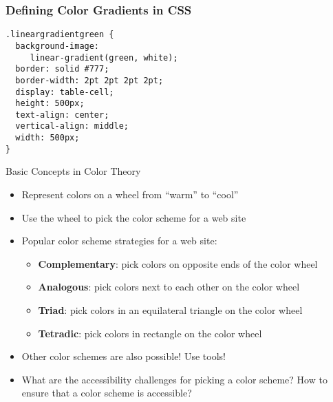 \documentclass[14pt,aspectratio=169]{beamer}
\begin{document}
%
\begin{frame}[fragile]
  \frametitle{Defining Color Gradients in CSS}
  \normalsize
  \begin{minipage}{6in}
    \vspace*{.1in}
    \begin{verbatim}
.lineargradientgreen {
  background-image:
     linear-gradient(green, white);
  border: solid #777;
  border-width: 2pt 2pt 2pt 2pt;
  display: table-cell;
  height: 500px;
  text-align: center;
  vertical-align: middle;
  width: 500px;
}
    \end{verbatim}
  \end{minipage}
\end{frame}


%
\begin{frame}{Basic Concepts in Color Theory}
  \begin{itemize}
    \item Represent colors on a wheel from ``warm'' to ``cool''
      \vspace*{-.2in}
    \item Use the wheel to pick the color scheme for a web site
      \vspace*{-.2in}
    \item Popular color scheme strategies for a web site:
      \begin{itemize}
        \item {\bf Complementary}: pick colors on opposite ends of the color
          wheel
        \item {\bf Analogous}: pick colors next to each other on the color wheel
        \item {\bf Triad}: pick colors in an equilateral triangle on the color
          wheel
        \item {\bf Tetradic}: pick colors in rectangle on the color
          wheel
      \end{itemize}
      \vspace*{-.25in}
    \item Other color schemes are also possible! Use tools!
      \vspace*{-.25in}
    \item What are the accessibility challenges for picking a color scheme? How
      to ensure that a color scheme is accessible?
  \end{itemize}
\end{frame}
\end{document}
